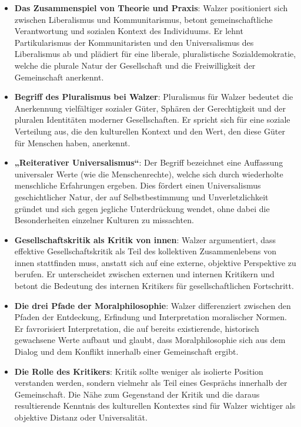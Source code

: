 \documentclass{article}
\begin{document}
\begin{itemize}
	\item \textbf{Das Zusammenspiel von Theorie und Praxis}:
	      Walzer positioniert sich zwischen Liberalismus und Kommunitarismus, betont gemeinschaftliche Verantwortung und sozialen Kontext des Individuums. Er lehnt Partikularismus der Kommunitaristen und den Universalismus des Liberalismus ab und plädiert für eine liberale, pluralistische Sozialdemokratie, welche die plurale Natur der Gesellschaft und die Freiwilligkeit der Gemeinschaft anerkennt.

	\item \textbf{Begriff des Pluralismus bei Walzer}:
	      Pluralismus für Walzer bedeutet die Anerkennung vielfältiger sozialer Güter, Sphären der Gerechtigkeit und der pluralen Identitäten moderner Gesellschaften. Er spricht sich für eine soziale Verteilung aus, die den kulturellen Kontext und den Wert, den diese Güter für Menschen haben, anerkennt.

	\item \textbf{„Reiterativer Universalismus“}:
	      Der Begriff bezeichnet eine Auffassung universaler Werte (wie die Menschenrechte), welche sich durch wiederholte menschliche Erfahrungen ergeben. Dies fördert einen Universalismus geschichtlicher Natur, der auf Selbstbestimmung und Unverletzlichkeit gründet und sich gegen jegliche Unterdrückung wendet, ohne dabei die Besonderheiten einzelner Kulturen zu missachten.

	\item \textbf{Gesellschaftskritik als Kritik von innen}:
	      Walzer argumentiert, dass effektive Gesellschaftskritik als Teil des kollektiven Zusammenlebens von innen stattfinden muss, anstatt sich auf eine externe, objektive Perspektive zu berufen. Er unterscheidet zwischen externen und internen Kritikern und betont die Bedeutung des internen Kritikers für gesellschaftlichen Fortschritt.

	\item \textbf{Die drei Pfade der Moralphilosophie}:
	      Walzer differenziert zwischen den Pfaden der Entdeckung, Erfindung und Interpretation moralischer Normen. Er favrorisiert Interpretation, die auf bereits existierende, historisch gewachsene Werte aufbaut und glaubt, dass Moralphilosophie sich aus dem Dialog und dem Konflikt innerhalb einer Gemeinschaft ergibt.

	\item \textbf{Die Rolle des Kritikers}:
	      Kritik sollte weniger als isolierte Position verstanden werden, sondern vielmehr als Teil eines Gesprächs innerhalb der Gemeinschaft. Die Nähe zum Gegenstand der Kritik und die daraus resultierende Kenntnis des kulturellen Kontextes sind für Walzer wichtiger als objektive Distanz oder Universalität.
\end{itemize}
\end{document}
